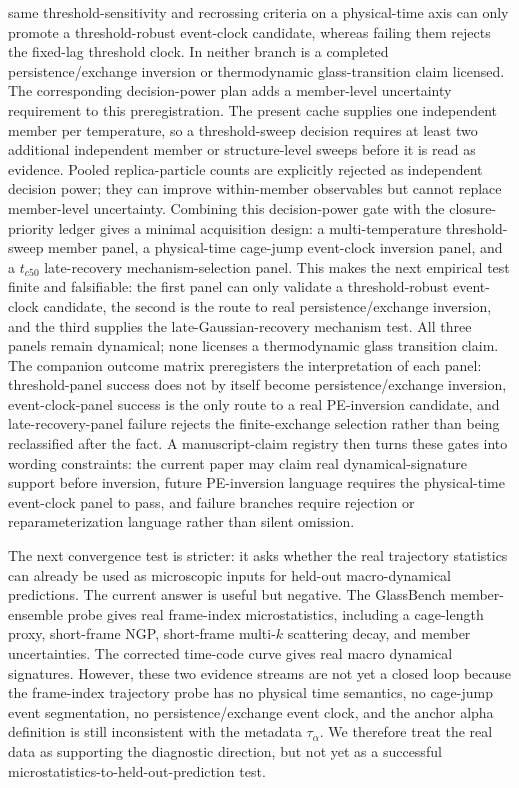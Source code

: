 \documentclass[aps,preprint,onecolumn,superscriptaddress,nofootinbib]{revtex4-2}
\begin{document}
same threshold-sensitivity and recrossing criteria on a physical-time axis can
only promote a threshold-robust event-clock candidate, whereas failing them
rejects the fixed-lag threshold clock. In neither branch is a completed
persistence/exchange inversion or thermodynamic glass-transition claim
licensed.
The corresponding decision-power plan adds a member-level uncertainty
requirement to this preregistration. The present cache supplies one independent
member per temperature, so a threshold-sweep decision requires at least two
additional independent member or structure-level sweeps before it is read as
evidence. Pooled replica-particle counts are explicitly rejected as independent
decision power; they can improve within-member observables but cannot replace
member-level uncertainty.
Combining this decision-power gate with the closure-priority ledger gives a
minimal acquisition design: a multi-temperature threshold-sweep member panel,
a physical-time cage-jump event-clock inversion panel, and a \(t_{c50}\)
late-recovery mechanism-selection panel. This makes the next empirical test
finite and falsifiable: the first panel can only validate a threshold-robust
event-clock candidate, the second is the route to real persistence/exchange
inversion, and the third supplies the late-Gaussian-recovery mechanism test.
All three panels remain dynamical; none licenses a thermodynamic glass
transition claim.
The companion outcome matrix preregisters the interpretation of each panel:
threshold-panel success does not by itself become persistence/exchange
inversion, event-clock-panel success is the only route to a real PE-inversion
candidate, and late-recovery-panel failure rejects the finite-exchange
selection rather than being reclassified after the fact.
A manuscript-claim registry then turns these gates into wording constraints:
the current paper may claim real dynamical-signature support before inversion,
future PE-inversion language requires the physical-time event-clock panel to
pass, and failure branches require rejection or reparameterization language
rather than silent omission.

The next convergence test is stricter: it asks whether the real trajectory
statistics can already be used as microscopic inputs for held-out
macro-dynamical predictions. The current answer is useful but negative. The
GlassBench member-ensemble probe gives real frame-index microstatistics,
including a cage-length proxy, short-frame NGP, short-frame multi-\(k\)
scattering decay, and member uncertainties. The corrected time-code curve
gives real macro dynamical signatures. However, these two evidence streams are
not yet a closed loop because the frame-index trajectory probe has no physical
time semantics, no cage-jump event segmentation, no persistence/exchange event
clock, and the anchor alpha definition is still inconsistent with the metadata
\(\tau_\alpha\). We therefore treat the real data as supporting the diagnostic
direction, but not yet as a successful microstatistics-to-held-out-prediction
test.
\end{document}
